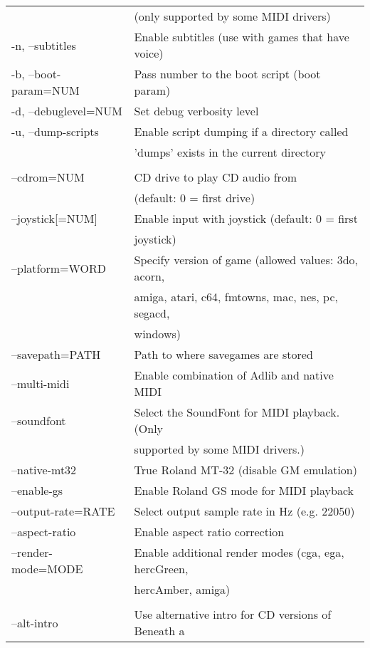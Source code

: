 \begin{tabular}{ll}
                          &(only supported by some MIDI drivers)\\
  -n, --subtitles         &Enable subtitles (use with games that have voice)\\
  -b, --boot-param=NUM    &Pass number to the boot script (boot param)\\
  -d, --debuglevel=NUM    &Set debug verbosity level\\
  -u, --dump-scripts      &Enable script dumping if a directory called\\
                          &'dumps' exists in the current directory\\
\\
  --cdrom=NUM             &CD drive to play CD audio from\\
                          &(default: 0 = first drive)\\
  --joystick[=NUM]        &Enable input with joystick (default: 0 = first\\
                          &joystick)\\
  --platform=WORD         &Specify version of game (allowed values: 3do, acorn,\\
                          &amiga, atari, c64, fmtowns, mac, nes, pc, segacd,\\
                          &windows)\\
  --savepath=PATH         &Path to where savegames are stored\\
  --multi-midi            &Enable combination of Adlib and native MIDI\\
  --soundfont             &Select the SoundFont for MIDI playback. (Only\\
                          &supported by some MIDI drivers.)\\
  --native-mt32           &True Roland MT-32 (disable GM emulation)\\
  --enable-gs             &Enable Roland GS mode for MIDI playback\\
  --output-rate=RATE      &Select output sample rate in Hz (e.g. 22050)\\
  --aspect-ratio          &Enable aspect ratio correction\\
  --render-mode=MODE      &Enable additional render modes (cga, ega, hercGreen,\\
                          &hercAmber, amiga)\\
\\
  --alt-intro             &Use alternative intro for CD versions of Beneath a\\

\end{tabular}
